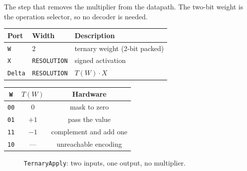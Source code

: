 \documentclass[11pt,a4paper]{article}
\begin{document}
The step that removes the multiplier from the datapath. The two-bit weight is
the operation selector, so no decoder is needed.

\begin{center}
\small
\begin{tabularx}{\linewidth}{@{}llL@{}}
\toprule
\textbf{Port} & \textbf{Width} & \textbf{Description} \\
\midrule
\texttt{W}     & 2  & ternary weight (2-bit packed) \\
\texttt{X}     & \texttt{RESOLUTION} & signed activation \\
\texttt{Delta} & \texttt{RESOLUTION} & $T(W) \cdot X$ \\
\bottomrule
\end{tabularx}
\end{center}

\begin{center}
\small
\begin{tabular}{@{}ccc@{}}
\toprule
\texttt{W} & $T(W)$ & \textbf{Hardware} \\
\midrule
\texttt{00} & $0$  & mask to zero \\
\texttt{01} & $+1$ & pass the value \\
\texttt{11} & $-1$ & complement and add one \\
\texttt{10} & ---  & unreachable encoding \\
\bottomrule
\end{tabular}
\end{center}

\begin{figure}[H]
\centering
{}
\caption{\texttt{TernaryApply}: two inputs, one output, no multiplier.}
\label{fig:apply}
\end{figure}
\end{document}
